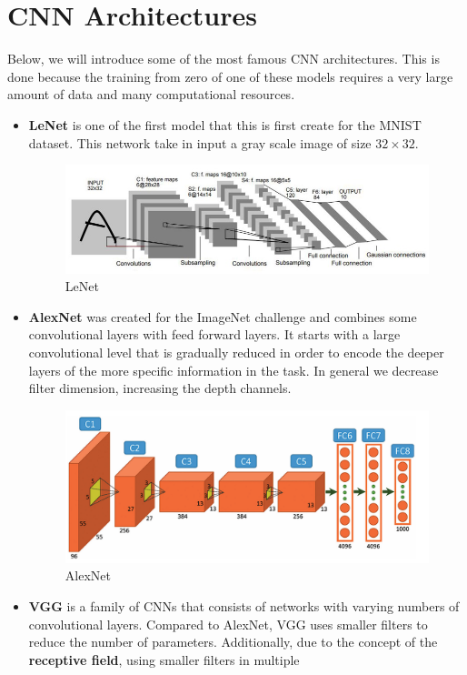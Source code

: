 \section{CNN Architectures}
Below, we will introduce some of the most famous CNN architectures. This is done
because the training from zero of one of these models requires a very large amount
of data and many computational resources.
\begin{itemize}
    \item \textbf{LeNet} is one of the first model that this is first create for
          the MNIST dataset. This network take in input a gray scale image of
          size $32 \times 32$.
          \begin{figure}[!ht]
              \centering
              \includegraphics[width=0.45\linewidth]{img/CNN/LeNet-5.jpeg}
              \caption{LeNet}
              \label{fig:lenet}
          \end{figure}
    \item \textbf{AlexNet} was created for the ImageNet challenge and combines
          some convolutional layers with feed forward layers. It starts with a
          large convolutional level that is gradually reduced in order to encode
          the deeper layers of the more specific information in the task. In
          general we decrease filter dimension, increasing the depth channels.
          \begin{figure}[!ht]
              \centering
              \includegraphics[width=0.45\linewidth]{img/CNN/alexNet.png}
              \caption{AlexNet}
              \label{fig:alexnet}
          \end{figure}
    \item \textbf{VGG} is a family of CNNs that consists of networks with varying
          numbers of convolutional layers. Compared to AlexNet, VGG uses smaller
          filters to reduce the number of parameters. Additionally, due to the
          concept of the \textbf{receptive field}, using smaller filters in multiple

\end{itemize}
